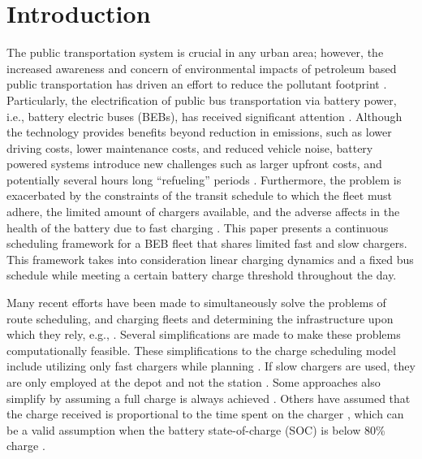 \section{Introduction}

\label{sec:introduction}

The public transportation system is crucial in any urban area; however, the increased awareness and concern of
environmental impacts of petroleum based public transportation has driven an effort to reduce the pollutant footprint
\cite{de-2014-simul-elect, xylia-2018-role-charg, guida-2017-zeeus-repor-europ, li-2016-batter-elect}. Particularly, the
electrification of public bus transportation via battery power, i.e., battery electric buses (BEBs), has received
significant attention \cite{li-2016-batter-elect}. Although the technology provides benefits beyond reduction in
emissions, such as lower driving costs, lower maintenance costs, and reduced vehicle noise, battery powered systems
introduce new challenges such as larger upfront costs, and potentially several hours long ``refueling'' periods
\cite{xylia-2018-role-charg, li-2016-batter-elect}. Furthermore, the problem is exacerbated by the constraints of the
transit schedule to which the fleet must adhere, the limited amount of chargers available, and the adverse affects in
the health of the battery due to fast charging \cite{lutsey-2019-updat-elect}. This paper presents a continuous
scheduling framework for a BEB fleet that shares limited fast and slow chargers. This framework takes into consideration
linear charging dynamics and a fixed bus schedule while meeting a certain battery charge threshold throughout the day.

Many recent efforts have been made to simultaneously solve the problems of route scheduling, and charging fleets and
determining the infrastructure upon which they rely, e.g., \cite{wei-2018-optim-spatio, sebastiani-2016-evaluat-elect,
  hoke-2014-accoun-lithium, wang-2017-elect-vehic}. Several simplifications are made to make these problems
computationally feasible. These simplifications to the charge scheduling model include utilizing only fast chargers
while planning \cite{wei-2018-optim-spatio, sebastiani-2016-evaluat-elect, wang-2017-optim-rechar, zhou-2020-bi-objec,
  yang-2018-charg-sched, wang-2017-elect-vehic, qin-2016-numer-analy,liu-2020-batter-elect}. If slow chargers are used,
they are only employed at the depot and not the station \cite{he-2020-optim-charg,tang-2019-robus-sched}. Some
approaches also simplify by assuming a full charge is always achieved
\cite{wei-2018-optim-spatio,wang-2017-elect-vehic,zhou-2020-bi-objec,wang-2017-optim-rechar}. Others have assumed that
the charge received is proportional to the time spent on the charger \cite{liu-2020-batter-elect,yang-2018-charg-sched},
which can be a valid assumption when the battery state-of-charge (SOC) is below 80\% charge
\cite{liu-2020-batter-elect}.

